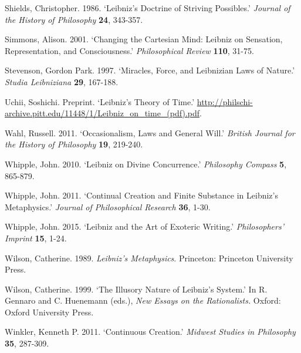 \documentclass{article}
\begin{document}
Shields, Christopher. 1986. `Leibniz's Doctrine of Striving Possibles.'
\emph{Journal of the History of Philosophy} \textbf{24}, 343-357.

Simmons, Alison. 2001. `Changing the Cartesian Mind: Leibniz on
Sensation, Representation, and Consciousness.' \emph{Philosophical
Review} \textbf{110}, 31-75.

Stevenson, Gordon Park. 1997. `Miracles, Force, and Leibnizian Laws of
Nature.' \emph{Studia Leibniziana} \textbf{29}, 167-188.

Uchii, Soshichi. Preprint. `Leibniz's Theory of Time.'
\url{http://philschi-archive.pitt.edu/11448/1/Leibniz_on_time_(pdf).pdf}.

Wahl, Russell. 2011. `Occasionalism, Laws and General Will.'
\emph{British Journal for the History of Philosophy} \textbf{19},
219-240.

Whipple, John. 2010. `Leibniz on Divine Concurrence.' \emph{Philosophy
Compass} \textbf{5}, 865-879.

Whipple, John. 2011. `Continual Creation and Finite Substance in
Leibniz's Metaphysics.' \emph{Journal of Philosophical Research}
\textbf{36}, 1-30.

Whipple, John. 2015. `Leibniz and the Art of Exoteric Writing.'
\emph{Philosophers' Imprint} \textbf{15}, 1-24.

Wilson, Catherine. 1989. \emph{Leibniz's Metaphysics}. Princeton:
Princeton University Press.

Wilson, Catherine. 1999. `The Illusory Nature of Leibniz's System.' In
R. Gennaro and C. Huenemann (eds.), \emph{New Essays on the
Rationalists.} Oxford: Oxford University Press.

Winkler, Kenneth P. 2011. `Continuous Creation.' \emph{Midwest Studies
in Philosophy} \textbf{35}, 287-309.
\printbibliography
\end{document}

